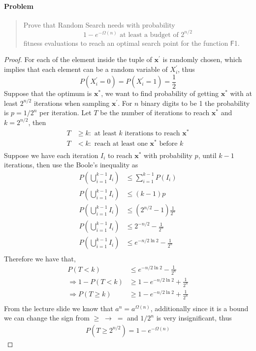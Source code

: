 \documentclass[a4paper, 12pt]{article}
\begin{document}
\paragraph{Problem}
    \begin{quote}
        Prove that Random Search needs with probability
        \[
            1 - e^{-\Omega(n)} 
            \text{ at least a budget of } 
            2^{n/2} 
        \]
        fitness evaluations to reach an optimal search point for the function $\mathsf{F}$1.
    \end{quote}
\begin{proof}
    For each of the element inside the tuple of $\mathbf{x}^\prime$ is randomly chosen, which implies that each element can be a random variable of
    $X^\prime_i$, thus
    \begin{equation*}
        P(X^\prime_i = 0) = P(X^\prime_i = 1) = \frac{1}{2} 
    \end{equation*}
    Suppose that the optimum is $\mathbf{x}^*$, we want to find probability of getting $\mathbf{x}^*$ with at least $2^{n/2}$ iterations when sampling 
    $\mathbf{x}^\prime$. For $n$ binary digits to be 1 the probability is $p = 1/2^n$ per iteration. Let $T$ be the number of iterations to reach $\mathbf{x}^*$
    and $k = 2^{n/2}$, then
    \begin{align*}
        T &\geq k:\text{ at least $k$ iterations to reach $\mathbf{x}^*$}\\
        T &< k: \text{ reach at least one $\mathbf{x}^*$ before $k$}\\
    \end{align*}
    Suppose we have each iteration $I_i$ to reach $\mathbf{x}^*$ with probability $p$, until $k-1$ iterations, then use the Boole's inequality as
    \begin{align*}
        P\left(\bigcup^{k-1}_{i=1}I_i\right) &\leq \sum_{i = 1}^{k-1}P(I_i)\\
        P\left(\bigcup^{k-1}_{i=1}I_i\right) &\leq (k-1)p\\
        P\left(\bigcup^{k-1}_{i=1}I_i\right) &\leq \left(2^{n/2} - 1\right)\frac{1}{2^n}\\
        P\left(\bigcup^{k-1}_{i=1}I_i\right) &\leq 2^{-n/2} - \frac{1}{2^n}\\
        P\left(\bigcup^{k-1}_{i=1}I_i\right) &\leq e^{-n/2\ln2}- \frac{1}{2^n}\\
    \end{align*}
    Therefore we have that,
    \begin{align*}
        P(T < k) &\leq e^{-n/2\ln2}- \frac{1}{2^n}\\
        \Rightarrow 1 - P(T < k) &\geq 1 - e^{-n/2\ln2} + \frac{1}{2^n}\\
        \Rightarrow P(T \geq k) &\geq 1 - e^{-n/2\ln2} + \frac{1}{2^n}\\
    \end{align*}
    From the lecture slide we know that $a^n = a^{\Omega(n)}$, additionally since it is a bound we can change the sign from $\geq\;\rightarrow\;=$
    and $1/2^n$ is very insignificant, thus
    \begin{align*}
        P(T \geq 2^{n/2}) = 1 - e^{-\Omega(n)}
    \end{align*}
\end{proof}
\end{document}
